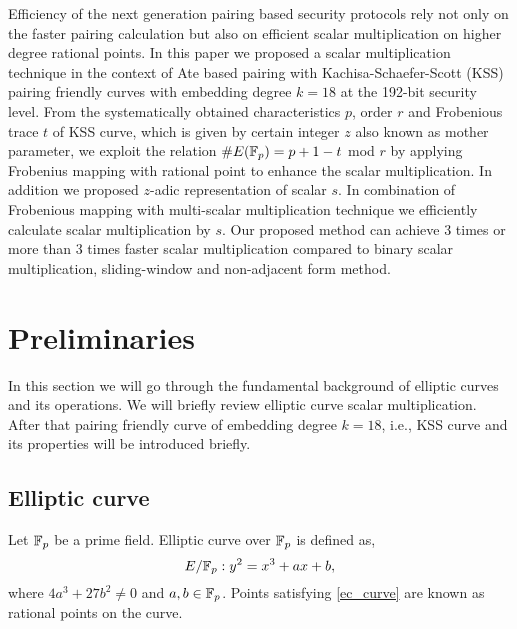 Efficiency of the next generation pairing based security protocols rely not only on the faster pairing calculation but also on efficient scalar multiplication on higher degree rational points. 
In this paper we proposed a scalar multiplication technique in the context of Ate based pairing with  Kachisa-Schaefer-Scott (KSS) pairing friendly curves with embedding degree $k = 18$ at the 192-bit security level.
From the systematically obtained characteristics $p$, order $r$ and Frobenious trace $t$ of KSS curve, which is given by certain integer $z$ also known as mother parameter, we exploit the relation $\#E({\mathbb{F}}_{p}) = p+1-t$ mod $r$  by applying Frobenius mapping with rational point to enhance the scalar multiplication.
In addition we proposed $z$-adic representation of scalar $s$.
In combination of Frobenious mapping with multi-scalar multiplication technique we efficiently calculate scalar multiplication by $s$.
Our proposed method can achieve 3 times or more than 3 times faster scalar multiplication compared to binary scalar multiplication, sliding-window and non-adjacent form method.



\section{Preliminaries}
In this section we will go through the fundamental background of elliptic curves and its operations. We will briefly review elliptic curve scalar multiplication. After that pairing friendly curve of embedding degree $k=18$, i.e., KSS curve and its properties will be introduced briefly.
\subsection{Elliptic curve \cite{washington2003elliptic}}
Let ${\mathbb{F}}_{p}$ be a prime field. Elliptic curve over ${\mathbb{F}}_{p}$ is defined as,
\begin{equation}\label{ec_curve}
E/{\mathbb{F}}_{p} : y^2=x^3+ax+b,
\end{equation}
where $ 4a^3+27b^2 \neq 0$ and $a,b \in {\mathbb{F}}_{p}$. Points satisfying \eqref{ec_curve} are known as rational points on the curve.

